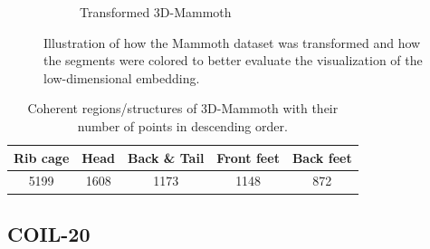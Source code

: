 \begin{figure}[!]
\begin{subfigure}[t]{0.45\columnwidth}
    	\caption{Transformed 3D-Mammoth}
        \label{fig:mammoth_trans_plot}
    \end{subfigure}
     \caption[Original and Transformed Mammoth]{Illustration of how the Mammoth dataset was transformed and how the segments were colored to better evaluate the visualization of the low-dimensional embedding.}
    \label{fig:orig_vs_trans_mammoth}
\end{figure}
\begin{table}[]
\centering
\begin{tabular}{|c|c|c|c|c|}
\hline
{\textcolor{rib_cage}{\textbf{Rib cage}}} &
  {\textcolor{head}{\textbf{Head}}} &
  {\textcolor{back_tail}{\textbf{Back \& Tail}}} &
  {\textcolor{front_feet}{\textbf{Front feet}}} &
  {\textcolor{back_feet}{\textbf{Back feet}}} \\ \hline
5199 &
  1608 &
  1173 &
  1148 &
  872 \\ \hline
\end{tabular}
\caption[Number of Points in 3D-Mammoth]{Coherent regions/structures of 3D-Mammoth with their number of points in descending order.}
\label{tab:num_datapoints_mammoth}
\end{table}

\subsection{COIL-20}

